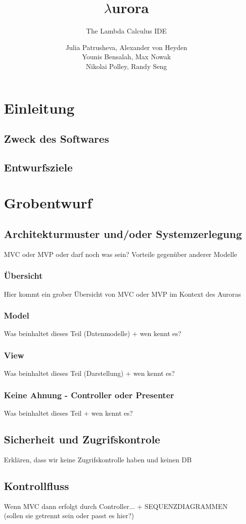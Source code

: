 \documentclass[parskip=full,11pt,twoside]{scrartcl}
\title{$\lambda$urora}
\subtitle{The Lambda Calculus IDE}
\author{Julia Patrusheva, Alexander von Heyden\\
Younis Bensalah, Max Nowak\\
Nikolai Polley, Randy Seng}
\begin{document}
\maketitle
\pagebreak
\tableofcontents
\pagebreak
\section{Einleitung}
\subsection{Zweck des Softwares}
\subsection{Entwurfsziele}
\pagebreak

\section{Grobentwurf}
\subsection{Architekturmuster und/oder Systemzerlegung}
MVC oder MVP oder darf noch was sein?
Vorteile gegenüber anderer Modelle
\subsubsection{Übersicht}
Hier kommt ein grober Übersicht von MVC oder MVP im Kontext des Auroras
\subsubsection{Model}
Was beinhaltet dieses Teil (Datenmodelle) + wen kennt es?
\subsubsection{View}
Was beinhaltet dieses Teil (Darstellung) + wen kennt es?
\subsubsection{Keine Ahnung - Controller oder Presenter}
Was beinhaltet dieses Teil + wen kennt es?


\subsection{Sicherheit und Zugrifskontrole}
Erklären, dass wir keine Zugrifskontrolle haben und keinen DB
\subsection{Kontrollfluss}
Wenn MVC dann erfolgt durch Controller...  + SEQUENZDIAGRAMMEN (sollen sie getrennt sein oder passt es hier?)
\end{document}
